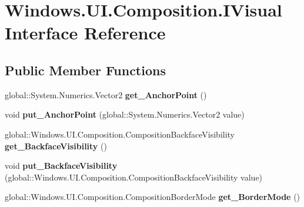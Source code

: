 \hypertarget{interface_windows_1_1_u_i_1_1_composition_1_1_i_visual}{}\section{Windows.\+U\+I.\+Composition.\+I\+Visual Interface Reference}
\label{interface_windows_1_1_u_i_1_1_composition_1_1_i_visual}
\subsection*{Public Member Functions}
\begin{DoxyCompactItemize}
\item 
\mbox{\label{interface_windows_1_1_u_i_1_1_composition_1_1_i_visual_a5954807f57ab0fb2f59d4ab8f73a2faa}} 
global\+::\+System.\+Numerics.\+Vector2 {\bfseries get\+\_\+\+Anchor\+Point} ()
\item 
\mbox{\label{interface_windows_1_1_u_i_1_1_composition_1_1_i_visual_a2a44f2ada8b97071f0b6b3139bf1aaae}} 
void {\bfseries put\+\_\+\+Anchor\+Point} (global\+::\+System.\+Numerics.\+Vector2 value)
\item 
\mbox{\label{interface_windows_1_1_u_i_1_1_composition_1_1_i_visual_a83e38e1d6e7fc6654c6e612d6e9314dd}} 
global\+::\+Windows.\+U\+I.\+Composition.\+Composition\+Backface\+Visibility {\bfseries get\+\_\+\+Backface\+Visibility} ()
\item 
\mbox{\label{interface_windows_1_1_u_i_1_1_composition_1_1_i_visual_a22c2fbf95af53308d61ed61707e52a15}} 
void {\bfseries put\+\_\+\+Backface\+Visibility} (global\+::\+Windows.\+U\+I.\+Composition.\+Composition\+Backface\+Visibility value)
\item 
\mbox{\label{interface_windows_1_1_u_i_1_1_composition_1_1_i_visual_ad857db42be0a85e8710144f9a8a0b412}} 
global\+::\+Windows.\+U\+I.\+Composition.\+Composition\+Border\+Mode {\bfseries get\+\_\+\+Border\+Mode} ()
\item 
\mbox{\label{interface_windows_1_1_u_i_1_1_composition_1_1_i_visual_a81dd6285766651fb4d55a78808dbfbdf}} 

\end{DoxyCompactItemize}
